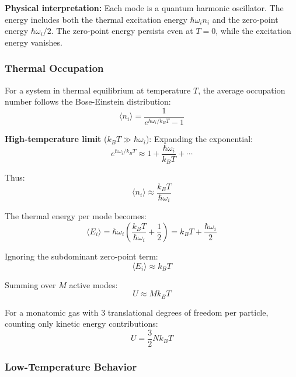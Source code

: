 \textbf{Physical interpretation:} Each mode is a quantum harmonic oscillator. The energy includes both the thermal excitation energy $\hbar\omega_i n_i$ and the zero-point energy $\hbar\omega_i/2$. The zero-point energy persists even at $T = 0$, while the excitation energy vanishes.

\subsubsection{Thermal Occupation}

For a system in thermal equilibrium at temperature $T$, the average occupation number follows the Bose-Einstein distribution:
\begin{equation}
\langle n_i \rangle = \frac{1}{e^{\hbar\omega_i/k_B T} - 1}
\end{equation}

\textbf{High-temperature limit} ($k_B T \gg \hbar\omega_i$): Expanding the exponential:
\begin{equation}
e^{\hbar\omega_i/k_B T} \approx 1 + \frac{\hbar\omega_i}{k_B T} + \cdots
\end{equation}

Thus:
\begin{equation}
\langle n_i \rangle \approx \frac{k_B T}{\hbar\omega_i}
\end{equation}

The thermal energy per mode becomes:
\begin{equation}
\langle E_i \rangle = \hbar\omega_i \left(\frac{k_B T}{\hbar\omega_i} + \frac{1}{2}\right) = k_B T + \frac{\hbar\omega_i}{2}
\end{equation}

Ignoring the subdominant zero-point term:
\begin{equation}
\langle E_i \rangle \approx k_B T
\end{equation}

Summing over $M$ active modes:
\begin{equation}
U \approx M k_B T
\end{equation}

For a monatomic gas with 3 translational degrees of freedom per particle, counting only kinetic energy contributions:
\begin{equation}
U = \frac{3}{2} N k_B T
\end{equation}

\subsubsection{Low-Temperature Behavior}

